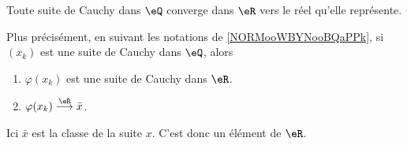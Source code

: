 \begin{lemma}      \label{LemooRTGFooYVstwS}
    Toute suite de Cauchy dans \( \eQ\) converge dans \( \eR\) vers le réel qu'elle représente.

    Plus précisément, en suivant les notations de \ref{NORMooWBYNooBQaPPk}, si \( (x_k)\) est une suite de Cauchy dans \( \eQ\), alors 
    \begin{enumerate}
        \item
            \( \varphi(x_k)\) est une suite de Cauchy dans \( \eR\).
        \item
            \( \varphi(x_k)\stackrel{\eR}{\longrightarrow}\bar x\).
    \end{enumerate}
    Ici \( \bar x\) est la classe de la suite \( x\). C'est donc un élément de \( \eR\).
\end{lemma}

